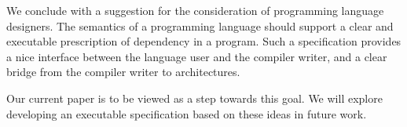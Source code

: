 We conclude with a suggestion for the consideration of programming language
designers.  The semantics of a programming language should support a clear
and executable prescription of dependency in a program.  Such a specification
provides a nice interface between the language user and the compiler writer,
and a clear bridge from the compiler writer to architectures.

Our current paper is to be viewed as a step towards this goal.  We will
explore developing an executable specification based on these ideas in future
work.
 



